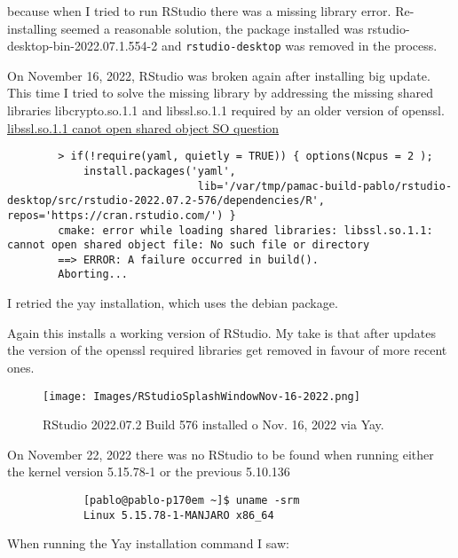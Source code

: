 \documentclass[]{scrartcl}
\begin{document}
	because when I tried to run RStudio there was a missing library error. 
	Re-installing seemed a reasonable solution, the package installed was rstudio-desktop-bin-2022.07.1.554-2 and \texttt{rstudio-desktop} was removed in the process.
	
	On November 16, 2022, RStudio was broken again after installing big update.
	This time I tried to solve the missing library by addressing the missing shared
	libraries libcrypto.so.1.1  and libssl.so.1.1 required by an older version of openssl.
	\href{https://stackoverflow.com/a/72366805/1585486}{libssl.so.1.1 canot open shared object SO question}
	
	\begin{tiny}
	\begin{verbatim}
		> if(!require(yaml, quietly = TRUE)) { options(Ncpus = 2 );
		    install.packages('yaml',
			                  lib='/var/tmp/pamac-build-pablo/rstudio-desktop/src/rstudio-2022.07.2-576/dependencies/R', repos='https://cran.rstudio.com/') }
		cmake: error while loading shared libraries: libssl.so.1.1: cannot open shared object file: No such file or directory
		==> ERROR: A failure occurred in build().
		Aborting...
	\end{verbatim}
	\end{tiny}


	I retried the yay installation, which uses the debian package.
	
	
	Again this installs a working version of RStudio. My take is that after updates the version of the
	openssl required libraries get removed in favour of more recent ones. 
	
	\begin{figure}[!htb]
	\centering
	\caption{RStudio 2022.07.2 Build 576 installed o Nov. 16, 2022 via Yay.}
	\texttt{[image: Images/RStudioSplashWindowNov-16-2022.png]}
	\end{figure}
	
	
	On November 22, 2022 there was no RStudio to be found when running either the kernel
	version 5.15.78-1 or the previous 5.10.136
	
	\begin{small}
		\begin{verbatim}
			[pablo@pablo-p170em ~]$ uname -srm
			Linux 5.15.78-1-MANJARO x86_64
		\end{verbatim}
	\end{small}
	
	When running the Yay installation command I saw:
	
\end{document}
